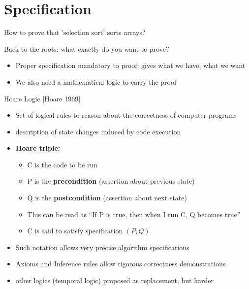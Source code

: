 \section{Specification}\sectionpage
\begin{frame}{How to prove that 'selection sort' sorts arrays?}
  \begin{block}{Back to the roots: what exactly do you want to prove?}
    \begin{itemize}
    \item Proper specification mandatory to proof: gives what we have, what we
      want
    \item We also need a mathematical logic to carry the proof
    \end{itemize}
  \end{block}

  \begin{block}{Hoare Logic {\normalsize[Hoare 1969]}}
    \begin{itemize}
    \item Set of logical rules to reason about the correctness of computer
      programs
    \item {} description of state changes induced by
      code execution
    \item \alert{\textbf{Hoare triple:}} 
      \begin{itemize}
      \item C is the code to be run
      \item P is the \alert{\textbf{precondition}}
        (assertion about previous state)
      \item Q is the \alert{\textbf{postcondition}}
        (assertion about next state)
      \item This can be read as ``If P is true, then when I run C, Q becomes
        true''
      \item C is said to satisfy specification $(P,Q)$
      \end{itemize}
    \item Such notation allows very precise algorithm specifications
    \item Axioms and Inference rules allow rigorous correctness demonstrations
      \smallskip
    \item {} other logics (temporal logic) proposed as
      replacement, but harder
    \end{itemize}
  \end{block}
\end{frame}

